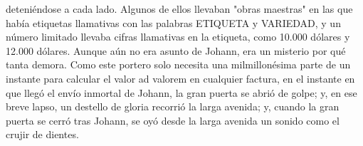 deteniéndose a cada lado. Algunos de ellos llevaban "obras maestras" en las que había etiquetas llamativas con las palabras ETIQUETA y VARIEDAD, y un número limitado llevaba cifras llamativas en la etiqueta, como 10.000 dólares y 12.000 dólares.
Aunque aún no era asunto de Johann, era un misterio por qué tanta demora. Como este portero solo necesita una milmillonésima parte de un instante para calcular el valor ad valorem en cualquier factura, en el instante en que llegó el envío inmortal de Johann, la gran puerta se abrió de golpe; y, en ese breve lapso, un destello de gloria recorrió la larga avenida; y, cuando la gran puerta se cerró tras Johann, se oyó desde la larga avenida un sonido como el crujir de dientes.
